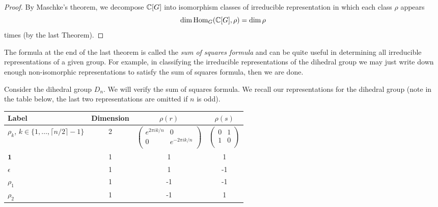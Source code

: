 \begin{proof}
  By Maschke's theorem, we decompose $\mathbb{C}[G]$ into isomorphism classes of irreducible representation in which each class $\rho$ appears \[\dim\operatorname{Hom}_G(\mathbb{C}[G], \rho) = \dim \rho\] times (by the last Theorem).
\end{proof}

The formula at the end of the last theorem is called the \emph{sum of squares formula} and can be quite useful in determining all irreducible representations of a given group. For example, in classifying the irreducible representations of the dihedral group we may just write down enough non-isomorphic representations to satisfy the sum of squares formula, then we are done.

\begin{example}
  Consider the dihedral group $D_n$. We will verify the sum of squares formula. We recall our representations for the dihedral group (note in the table below, the last two representations are omitted if $n$ is odd).
  \begin{center}
    \begin{tabular}{lccc}
      \toprule
      Label                                                  & Dimension & $\rho(r)$ & $\rho(s)$ \\
      \midrule
      $\rho_k$, $k \in \{1, \ldots, \lceil n/2 \rceil - 1\}$ & 2         &
      $\begin{pmatrix}
           e^{2\pi i k/n} & 0               \\
           0              & e^{-2\pi i k/n} \\
         \end{pmatrix}$                    &
      $\begin{pmatrix}
           0 & 1 \\
           1 & 0 \\
         \end{pmatrix}$
      \\
      $\bm 1$                                                & 1         & 1         & 1         \\
      $\epsilon$                                             & 1         & 1         & -1        \\
      $\rho_1$                                               & 1         & -1        & -1        \\
      $\rho_2$                                               & 1         & -1        & 1         \\
      \bottomrule

\end{tabular}
\end{center}
\end{example}
